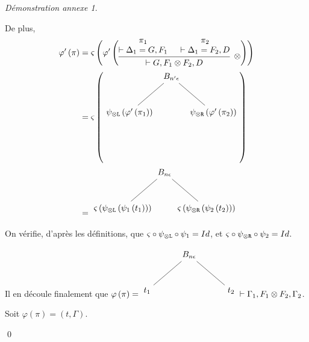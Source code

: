 \documentclass[11pt,a4paper]{article}
\theoremstyle{plain}
\theoremstyle{definition}
\theoremstyle{remark}
\newtheorem{demonstrationappendix}{Démonstration annexe}
\newcommand*{\tensor}{\otimes}
\newcommand*{\namedproofv}[2]{\hypo{#1}\infer[no rule]{1}{\vdash #2}}
\newcommand*{\tensorv}[1]{\infer{2}[\ensuremath{\tensor}]{\vdash #1}}
\newcommand*{\someperm}{\varsigma}
\newcommand*{\sequent}{\Gamma}
\newcommand*{\sequentbis}{\Delta}
\newcommand*{\Left}{\textnormal{\texttt{L}}}
\newcommand*{\Right}{\textnormal{\texttt{R}}}
\newcommand*{\encode}{\ensuremath{\varphi}}
\begin{document}
\begin{demonstrationappendix}
\begin{description}
        De plus, 
        \begin{equation*}
            \begin{split}
            \encode' \left( \pi \right) & = 
            \someperm \left( \encode' \left( 
            \begin{prooftree}
                \namedproofv{\pi_1}{\sequentbis_1 = G, F_1}
                \namedproofv{\pi_2}{\sequentbis_1 = F_2, D}
                \tensorv{G, F_1 \tensor F_2, D}
            \end{prooftree}
            \right) \right) \\
            & = \someperm \left(
            \begin{tikzpicture}%
            [level distance=1.5cm,
            level 1/.style={sibling distance=3.5cm}]
            \node {$B_{n' \epsilon}$}
                child {node {$\psi_{\tensor\Left} \left( \encode' \left(
                        \pi_1
                      \right) \right)$}}
                child {node {$\psi_{\tensor\Right} \left( \encode' \left(
                        \pi_2
                      \right) \right)$}
            };
            \end{tikzpicture} 
            \right) \\
            & = \begin{tikzpicture}%
            [level distance=1.5cm,
            level 1/.style={sibling distance=3.5cm}]
            \node {$B_{n \epsilon}$}
                child {node {$\someperm \left( \psi_{\tensor\Left} \left( \psi_1 \left(
                        t_1
                      \right) \right) \right)$}}
                child {node {$\someperm \left( \psi_{\tensor\Right} \left( \psi_2 \left(
                        t_2
                      \right) \right) \right)$}
            };
            \end{tikzpicture} 
            \end{split}
        \end{equation*}
    
        On vérifie, d'après les définitions, que $\someperm \circ \psi_{\tensor\Left} \circ \psi_1 = Id$, et $\someperm \circ \psi_{\tensor\Right} \circ \psi_2 = Id$.
    
        Il en découle finalement que $\encode \left( \pi \right) = 
        \begin{tikzpicture}%
            [level distance=1.5cm,
            level 1/.style={sibling distance=3.5cm}]
            \node {$B_{n \epsilon}$}
                child {node {$t_1$}}
                child {node {$t_2$}
            };
            \end{tikzpicture} 
            \vdash \sequent_1, F_1 \tensor F_2, \sequent_2$. 
            
            Soit $\encode \left( \pi \right) = \left( t, \sequent \right)$.
    \end{description}
      
    \qed{}
\end{demonstrationappendix}
\end{document}
